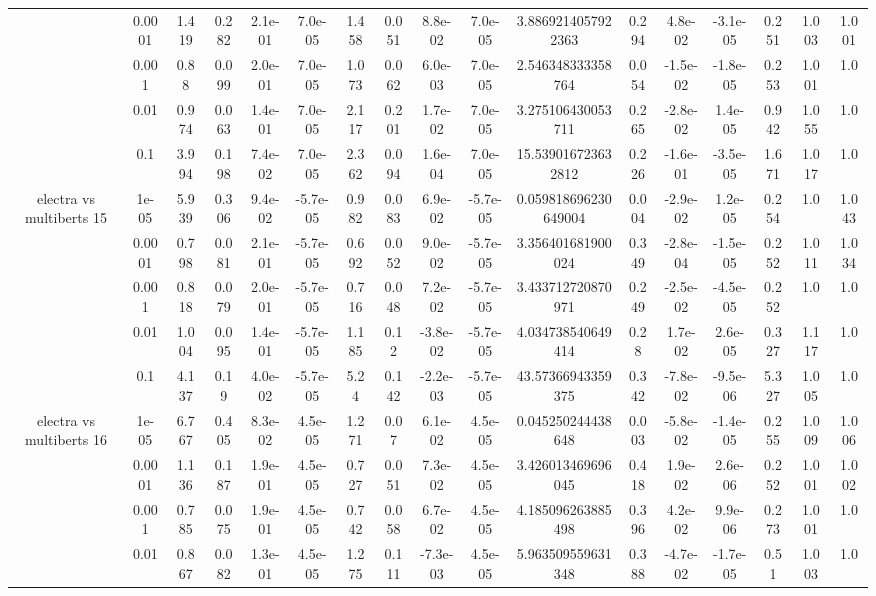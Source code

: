 \begin{tabular}{|c|c|c|c|c|c|c|c|c|c|c|c|c|c|c|c|c|}
 & 0.0001 & 1.419 & 0.282 & 2.1e-01 & 7.0e-05 & 1.458 & 0.051 & 8.8e-02 & 7.0e-05 & 3.8869214057922363 & 0.294 & 4.8e-02 & -3.1e-05 & 0.251 & 1.003 & 1.001 \\
 & 0.001 & 0.88 & 0.099 & 2.0e-01 & 7.0e-05 & 1.073 & 0.062 & 6.0e-03 & 7.0e-05 & 2.546348333358764 & 0.054 & -1.5e-02 & -1.8e-05 & 0.253 & 1.001 & 1.0 \\
 & 0.01 & 0.974 & 0.063 & 1.4e-01 & 7.0e-05 & 2.117 & 0.201 & 1.7e-02 & 7.0e-05 & 3.275106430053711 & 0.265 & -2.8e-02 & 1.4e-05 & 0.942 & 1.055 & 1.0 \\
 & 0.1 & 3.994 & 0.198 & 7.4e-02 & 7.0e-05 & 2.362 & 0.094 & 1.6e-04 & 7.0e-05 & 15.539016723632812 & 0.226 & -1.6e-01 & -3.5e-05 & 1.671 & 1.017 & 1.0 \\
\hline
\multirow{5}{*}{electra  vs multiberts 15} & 1e-05 & 5.939 & 0.306 & 9.4e-02 & -5.7e-05 & 0.982 & 0.083 & 6.9e-02 & -5.7e-05 & 0.059818696230649004 & 0.004 & -2.9e-02 & 1.2e-05 & 0.254 & 1.0 & 1.043 \\
 & 0.0001 & 0.798 & 0.081 & 2.1e-01 & -5.7e-05 & 0.692 & 0.052 & 9.0e-02 & -5.7e-05 & 3.356401681900024 & 0.349 & -2.8e-04 & -1.5e-05 & 0.252 & 1.011 & 1.034 \\
 & 0.001 & 0.818 & 0.079 & 2.0e-01 & -5.7e-05 & 0.716 & 0.048 & 7.2e-02 & -5.7e-05 & 3.433712720870971 & 0.249 & -2.5e-02 & -4.5e-05 & 0.252 & 1.0 & 1.0 \\
 & 0.01 & 1.004 & 0.095 & 1.4e-01 & -5.7e-05 & 1.185 & 0.12 & -3.8e-02 & -5.7e-05 & 4.034738540649414 & 0.28 & 1.7e-02 & 2.6e-05 & 0.327 & 1.117 & 1.0 \\
 & 0.1 & 4.137 & 0.19 & 4.0e-02 & -5.7e-05 & 5.24 & 0.142 & -2.2e-03 & -5.7e-05 & 43.57366943359375 & 0.342 & -7.8e-02 & -9.5e-06 & 5.327 & 1.005 & 1.0 \\
\hline
\multirow{5}{*}{electra  vs multiberts 16} & 1e-05 & 6.767 & 0.405 & 8.3e-02 & 4.5e-05 & 1.271 & 0.07 & 6.1e-02 & 4.5e-05 & 0.045250244438648 & 0.003 & -5.8e-02 & -1.4e-05 & 0.255 & 1.009 & 1.006 \\
 & 0.0001 & 1.136 & 0.187 & 1.9e-01 & 4.5e-05 & 0.727 & 0.051 & 7.3e-02 & 4.5e-05 & 3.426013469696045 & 0.418 & 1.9e-02 & 2.6e-06 & 0.252 & 1.001 & 1.002 \\
 & 0.001 & 0.785 & 0.075 & 1.9e-01 & 4.5e-05 & 0.742 & 0.058 & 6.7e-02 & 4.5e-05 & 4.185096263885498 & 0.396 & 4.2e-02 & 9.9e-06 & 0.273 & 1.001 & 1.0 \\
 & 0.01 & 0.867 & 0.082 & 1.3e-01 & 4.5e-05 & 1.275 & 0.111 & -7.3e-03 & 4.5e-05 & 5.963509559631348 & 0.388 & -4.7e-02 & -1.7e-05 & 0.51 & 1.003 & 1.0 \\

\end{tabular}

